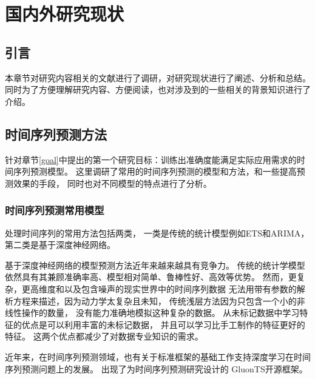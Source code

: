 
\chapter{国内外研究现状}\label{chapter2}
\section{引言}
本章节对研究内容相关的文献进行了调研，对研究现状进行了阐述、分析和总结。
同时为了方便理解研究内容、方便阅读，也对涉及到的一些相关的背景知识进行了介绍。
\section{时间序列预测方法}
  针对章节\ref{goal}中提出的第一个研究目标：训练出准确度能满足实际应用需求的时间序列预测模型。
  这里调研了常用的时间序列预测的模型和方法，和一些提高预测效果的手段，
  同时也对不同模型的特点进行了分析。
\subsection{时间序列预测常用模型}

  处理时间序列的常用方法包括两类，
  一类是传统的统计模型例如ETS和ARIMA，第二类是基于深度神经网络。

  基于深度神经网络的模型预测方法近年来越来越具有竞争力。
  传统的统计学模型依然具有其兼顾准确率高、模型相对简单、鲁棒性好、高效等优势。
  然而，更复杂，更高维度和以及包含噪声的现实世界中的时间序列数据
  无法用带有参数的解析方程来描述，因为动力学太复杂且未知，
  传统浅层方法因为只包含一个小的非线性操作的数量，
  没有能力准确地模拟这种复杂的数据。
  从未标记数据中学习特征的优点是可以利用丰富的未标记数据，
  并且可以学习比手工制作的特征更好的特征。
  这两个优点都减少了对数据专业知识的需求。

  近年来，在时间序列预测领域，也有关于标准框架的基础工作支持深度学习在时间序列预测问题上的发展。
  出现了为时间序列预测研究设计的
  GluonTS开源框架\cite{DBLP:journals/corr/abs-1906-05264}。

